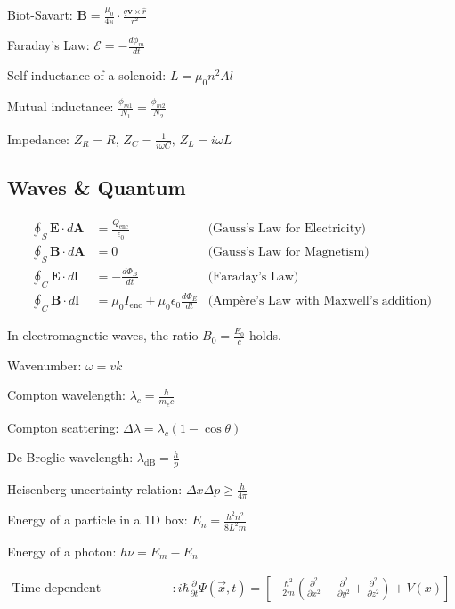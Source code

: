 \documentclass[12pt,a4paper]{article}
\begin{document}
	Biot-Savart: \( \mathbf{B} = \frac{\mu_0}{4 \pi} \cdot \frac{q \mathbf{v} \times \hat{r}}{r^2} \)
	
	Faraday's Law: \( \mathcal{E} = -\frac{d \phi_m}{dt} \)
	
	Self-inductance of a solenoid: \( L = \mu_0 n^2 A l \)
	
	Mutual inductance: \( \frac{\phi_{m1}}{N_1} = \frac{\phi_{m2}}{N_2} \)
	
	Impedance: \( Z_R = R, \, Z_C = \frac{1}{i \omega C}, \, Z_L = i \omega L \)
	
	
	\subsection*{Waves \& Quantum}
	\begin{align}
		\oint_{S} \mathbf{E} \cdot d\mathbf{A} &= \frac{Q_{\text{enc}}}{\epsilon_0} &\text{(Gauss's Law for Electricity)} \\
		\oint_{S} \mathbf{B} \cdot d\mathbf{A} &= 0 &\text{(Gauss's Law for Magnetism)} \\
		\oint_{C} \mathbf{E} \cdot d\mathbf{l} &= -\frac{d\Phi_{B}}{dt} &\text{(Faraday's Law)} \\
		\oint_{C} \mathbf{B} \cdot d\mathbf{l} &= \mu_0 I_{\text{enc}} + \mu_0 \epsilon_0 \frac{d\Phi_{E}}{dt} &\text{(Ampère's Law with Maxwell's addition)}
	\end{align}
	
	In electromagnetic waves, the ratio \( B_0 = \frac{E_0}{c} \) holds.
	
	Wavenumber: \( \omega = vk \)
	
	Compton wavelength: \( \lambda_c = \frac{h}{m_e c} \)
	
	Compton scattering: \( \Delta \lambda = \lambda_c (1-\cos \theta )\)
	
	De Broglie wavelength: \( \lambda_{\text{dB}} = \frac{h}{p} \)
	
	Heisenberg uncertainty relation: \( \Delta x \Delta p \geq \frac{h}{4\pi} \)
	
	Energy of a particle in a 1D box: \( E_n = \frac{h^2 n^2}{8L^2m} \)
	
	Energy of a photon: \( h \nu = E_m - E_n\)

	\begin{align*}
		\text{Time-dependent Schrodinger's Equation} & : i\hbar \frac{\partial}{\partial t} \Psi (\vec{x}, t) = [-\frac{\hbar^2}{2m}(\frac{\partial ^2}{\partial x^2} + \frac{\partial ^2}{\partial y ^2} + \frac{\partial^2}{\partial z^2}) + V(x)] \\
	\end{align*}
	
\end{document}
